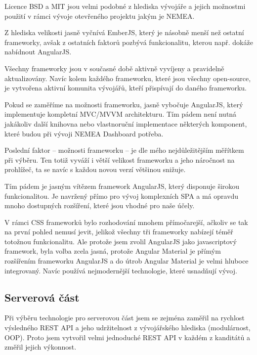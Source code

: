 
Licence BSD a MIT jsou velmi podobné z hlediska vývojáře a jejich možnostmi použití v rámci vývoje otevřeného projektu jakým je NEMEA.

Z hlediska velikosti jasně vyčnívá EmberJS, který je násobně menší než ostatní frameworky, avšak z ostatních faktorů pozbývá funkcionalitu, kterou např. dokáže nabídnout AngularJS.

Všechny frameworky jsou v současné době aktivně vyvíjeny a pravidelně aktualizovány. Navíc kolem každého frameworku, které jsou všechny open-source, je vytvořena aktivní komunita vývojářů, kteří přispívají do daného frameworku.

Pokud se zaměříme na možnosti frameworku, jasně vybočuje AngularJS, který implementuje kompletní MVC/MVVM architekturu. Tím pádem není nutná jakákoliv další knihovna nebo vlastnoruční implementace některých komponent, které budou při vývoji NEMEA Dashboard potřeba.

Poslední faktor -- možnosti frameworku -- je dle mého nejdůležitějším měřítkem při výběru. Ten totiž vyváží i větší velikost frameworku a jeho náročnost na prohlížeč, ta se navíc s každou novou verzí většinou snižuje.

Tím pádem je jasným vítězem framework AngularJS, který disponuje širokou funkcionalitou. Je navržený přímo pro vývoj komplexních SPA a má opravdu mnoho dostupných rozšíření, které jsou vhodné pro naše účely.

V rámci CSS frameworků bylo rozhodování mnohem přímočarejší, ačkoliv se tak na první pohled nemusí jevit, jelikož všechny tři frameworky nabízejí téměř totožnou funkcionalitu. Ale protože jsem zvolil AngularJS jako javascriptový framework, byla volba zcela jasná, protože Angular Material je přímým rozšířením frameworku AngularJS a do útrob Angular Material je velmi hluboce integrovaný. Navíc používá nejmodernější technologie, které usnadňují vývoj.

\subsection{Serverová část}

Při výběru technologie pro serverovou část jsem se zejména zaměřil na rychlost výsledného REST API a jeho udržitelnost z vývojářského hlediska (modulárnost, OOP). Proto jsem vytvořil velmi jednoduché REST API v každém z kanditátů a změřil jejich výkonnost.

